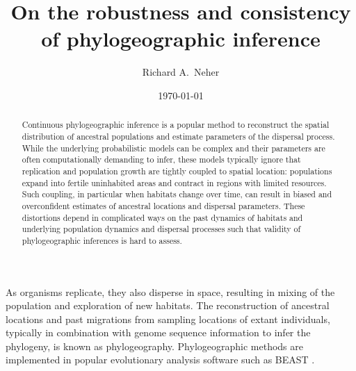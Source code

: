 \documentclass[aps,rmp, twocolumn]{revtex4}
\begin{document}
\title{On the robustness and consistency of phylogeographic inference}
\author{Richard A.~Neher}
\date{\today}
\begin{abstract}
Continuous phylogeographic inference is a popular method to reconstruct the spatial distribution of ancestral populations and estimate parameters of the dispersal process.
While the underlying probabilistic models can be complex and their parameters are often computationally demanding to infer, these models typically ignore that replication and population growth are tightly coupled to spatial location: populations expand into fertile uninhabited areas and contract in regions with limited resources.
Such coupling, in particular when habitats change over time, can result in biased and overconfident estimates of ancestral locations and dispersal parameters.
These distortions depend in complicated ways on the past dynamics of habitats and underlying population dynamics and dispersal processes such that validity of phylogeographic inferences is hard to assess.
\end{abstract}

\maketitle
As organisms replicate, they also disperse in space, resulting in mixing of the population and exploration of new habitats.
The reconstruction of ancestral locations and past migrations from sampling locations of extant individuals, typically in combination with genome sequence information to infer the phylogeny, is known as phylogeography.
Phylogeographic methods are implemented in popular evolutionary analysis software such as BEAST \citep{lemey_bayesian_2009,lemey_phylogeography_2010}.
\end{document}
